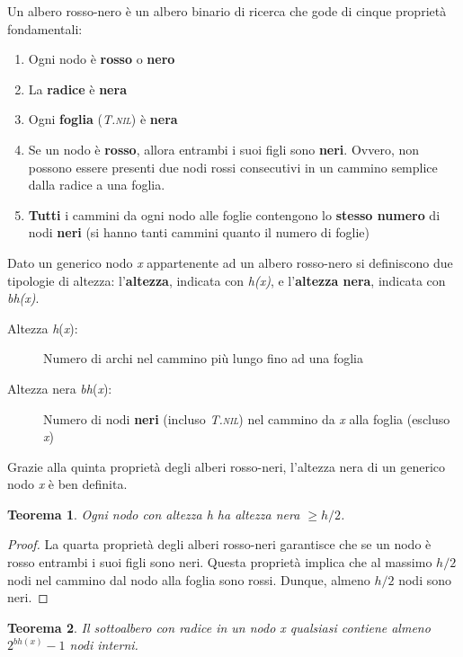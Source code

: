 \documentclass[10pt, a4paper]{report}
\newtheorem{theorem}{Teorema}[chapter]
\begin{document}
Un albero rosso-nero è un albero binario di ricerca che gode di cinque proprietà fondamentali:
\begin{enumerate}
\item Ogni nodo è \textbf{rosso} o \textbf{nero}
\item La \textbf{radice} è \textbf{nera}
\item Ogni \textbf{foglia} (\textit{T.\textsc{nil}}) è \textbf{nera}
\item Se un nodo è \textbf{rosso}, allora entrambi i suoi figli sono \textbf{neri}. Ovvero, non possono essere presenti due nodi rossi consecutivi in un cammino semplice dalla radice a una foglia.
\item \textbf{Tutti} i cammini da ogni nodo alle foglie contengono lo \textbf{stesso numero} di nodi \textbf{neri} (si hanno tanti cammini quanto il numero di foglie)
\end{enumerate}
Dato un generico nodo \textit{x} appartenente ad un albero rosso-nero si definiscono due tipologie di altezza: l'\textbf{altezza}, indicata con \textit{h(x)}, e l'\textbf{altezza nera}, indicata con \textit{bh(x)}.
\begin{description}
\item[Altezza \textit{h}(\textit{x}):]Numero di archi nel cammino più lungo fino ad una foglia
\item[Altezza nera \textit{bh}(\textit{x}):]Numero di nodi \textbf{neri} (incluso \textit{T.\textsc{nil}}) nel cammino da \textit{x} alla foglia (escluso \textit{x})
\end{description}
Grazie alla quinta proprietà degli alberi rosso-neri, l'altezza nera di un generico nodo \textit{x} è ben definita.
\begin{theorem}
Ogni nodo con altezza \textit{h} ha altezza nera $\geq h/2$.
\end{theorem}
\begin{proof}
La quarta proprietà degli alberi rosso-neri garantisce che se un nodo è rosso entrambi i suoi figli sono neri. Questa proprietà implica che al massimo $h/2$ nodi nel cammino dal nodo alla foglia sono rossi. Dunque, almeno $h/2$ nodi sono neri.
\end{proof}
\begin{theorem}
Il sottoalbero con radice in un nodo \textit{x} qualsiasi contiene almeno $2^{bh(x)} - 1$ nodi interni.
\end{theorem}
\end{document}
